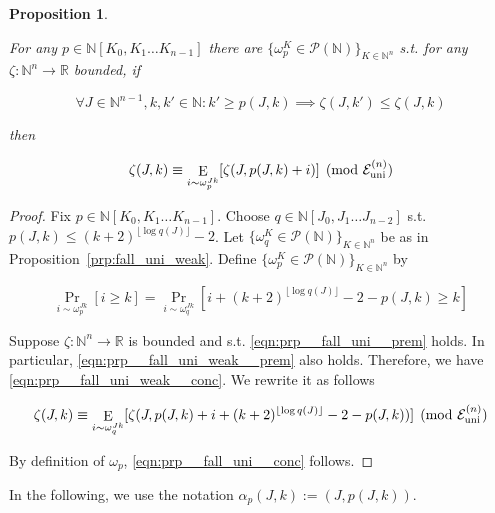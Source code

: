 \documentclass{article}
\numberwithin{equation}{section}
\theoremstyle{definition}
\theoremstyle{plain}
\newtheorem{proposition}{Proposition}[section]
\DeclareMathOperator{\Prb}{Pr}
\DeclareMathOperator{\E}{E}
\newcommand{\Nats}{\mathbb{N}}
\newcommand{\Reals}{\mathbb{R}}
\newcommand{\NatPoly}{\Nats[K_0, K_1 \ldots K_{n-1}]}
\newcommand{\NatPolyJ}{\Nats[J_0, J_1 \ldots J_{n-2}]}
\newcommand{\NatFun}{\Nats^n \rightarrow}
\newcommand{\Floor}[1]{\lfloor #1 \rfloor}
\newcommand{\Fall}{\mathcal{E}}
\newcommand{\FallU}{{\Fall_{\textnormal{uni}}^{(n)}}}
\begin{document}
\begin{samepage}
\begin{proposition}
\label{prp:fall_uni}

For any ${p \in \NatPoly}$ there are ${\{\omega_p^K \in \mathcal{P}(\Nats)\}_{K \in \Nats^n}}$ s.t. for any ${\zeta: \NatFun \Reals}$ bounded, if 

\begin{equation}
\label{eqn:prp__fall_uni__prem}
\forall J \in \Nats^{n-1}, k,k' \in \Nats: k' \geq p(J,k) \implies \zeta(J,k') \leq \zeta(J,k)
\end{equation}

then

\begin{equation}
\label{eqn:prp__fall_uni__conc}
\zeta(J,k) \equiv \E_{i \sim \omega_p^{Jk}}[\zeta(J,p(J,k)+i)] \pmod \FallU
\end{equation}

\end{proposition}
\end{samepage}

\begin{proof}

Fix ${p \in \NatPoly}$. Choose ${q \in \NatPolyJ}$ s.t. ${p(J,k) \leq (k+2)^{\Floor{\log q(J)}}}-2$. Let ${\{\omega_q^K \in \mathcal{P}(\Nats)\}_{K \in \Nats^n}}$ be as in Proposition~\ref{prp:fall_uni_weak}. Define ${\{\omega_p^K \in \mathcal{P}(\Nats)\}_{K \in \Nats^n}}$ by

\[\Prb_{i \sim \omega_p^{Jk}}[i \geq k] = \Prb_{i \sim \omega_q^{Jk}}[i + (k+2)^{\Floor{\log q(J)}} - 2 - p(J,k) \geq k]\]

Suppose ${\zeta: \NatFun \Reals}$ is bounded and s.t. \ref{eqn:prp__fall_uni__prem} holds. In particular, \ref{eqn:prp__fall_uni_weak__prem} also holds. Therefore, we have \ref{eqn:prp__fall_uni_weak__conc}. We rewrite it as follows

\[\zeta(J,k) \equiv \E_{i \sim \omega_q^{Jk}}[\zeta(J, p(J,k) + i+ (k+2)^{\Floor{\log q(J)}} - 2 - p(J,k))] \pmod \FallU\]

By definition of ${\omega_p}$, \ref{eqn:prp__fall_uni__conc} follows.
%
\end{proof}

In the following, we use the notation ${\alpha_{p}(J,k):=(J,p(J,k))}$.
\end{document}

